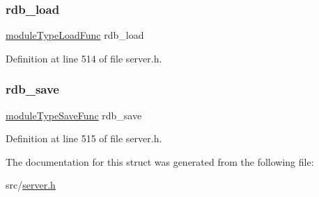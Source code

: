 \subsubsection{\texorpdfstring{rdb\+\_\+load}{rdb\_load}}
{\footnotesize\ttfamily \hyperlink{server_8h_a828eedada3f580a3c87038a86451482a}{module\+Type\+Load\+Func} rdb\+\_\+load}



Definition at line 514 of file server.\+h.

\mbox{\label{struct_redis_module_type_a0cd3611f995b73531f3cba3716f69839}} 
\subsubsection{\texorpdfstring{rdb\+\_\+save}{rdb\_save}}
{\footnotesize\ttfamily \hyperlink{server_8h_a135930c4755891558676ed788fae701b}{module\+Type\+Save\+Func} rdb\+\_\+save}



Definition at line 515 of file server.\+h.



The documentation for this struct was generated from the following file\+:\begin{DoxyCompactItemize}
\item 
src/\hyperlink{server_8h}{server.\+h}\end{DoxyCompactItemize}
